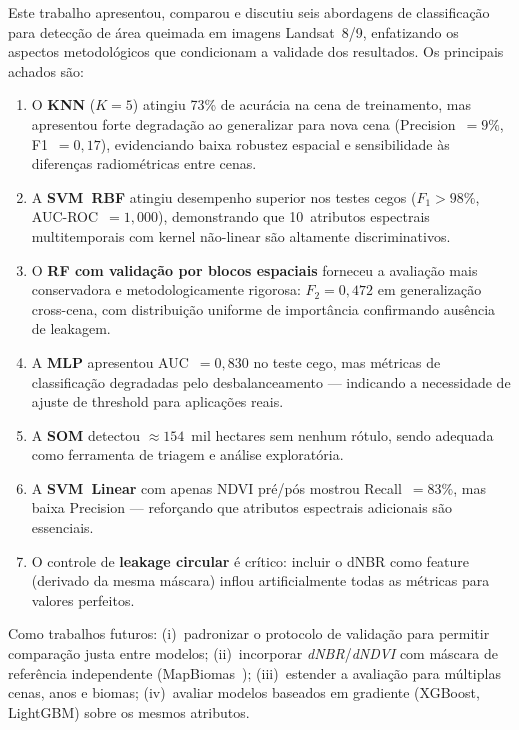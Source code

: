 \documentclass[conference]{IEEEtran}
\begin{document}
Este trabalho apresentou, comparou e discutiu seis abordagens de
classificação para detecção de área queimada em imagens Landsat~8/9,
enfatizando os aspectos metodológicos que condicionam a validade dos
resultados. Os principais achados são:

\begin{enumerate}
  \item O \textbf{KNN} ($K=5$) atingiu 73\% de acurácia na cena de
        treinamento, mas apresentou forte degradação ao generalizar para
        nova cena (Precision~$= 9\%$, F1~$= 0{,}17$), evidenciando baixa
        robustez espacial e sensibilidade às diferenças radiométricas
        entre cenas.
  \item A \textbf{SVM~RBF} atingiu desempenho superior nos testes cegos
        ($F_1 > 98\%$, AUC-ROC~$= 1{,}000$), demonstrando que 10~atributos
        espectrais multitemporais com kernel não-linear são altamente
        discriminativos.
  \item O \textbf{RF com validação por blocos espaciais} forneceu a
        avaliação mais conservadora e metodologicamente rigorosa:
        $F_2 = 0{,}472$ em generalização cross-cena, com distribuição
        uniforme de importância confirmando ausência de leakagem.
  \item A \textbf{MLP} apresentou AUC~$= 0{,}830$ no teste cego, mas
        métricas de classificação degradadas pelo desbalanceamento —
        indicando a necessidade de ajuste de threshold para aplicações reais.
  \item A \textbf{SOM} detectou $\approx154$~mil hectares sem nenhum
        rótulo, sendo adequada como ferramenta de triagem e análise
        exploratória.
  \item A \textbf{SVM~Linear} com apenas NDVI pré/pós mostrou Recall~$= 83\%$,
        mas baixa Precision — reforçando que atributos espectrais adicionais
        são essenciais.
  \item O controle de \textbf{leakage circular} é crítico: incluir o dNBR
        como feature (derivado da mesma máscara) inflou artificialmente todas
        as métricas para valores perfeitos.
\end{enumerate}

Como trabalhos futuros: (i)~padronizar o protocolo de validação para
permitir comparação justa entre modelos; (ii)~incorporar
\textit{dNBR}/\textit{dNDVI} com máscara de referência independente
(MapBiomas~\cite{b6}); (iii)~estender a avaliação para múltiplas cenas,
anos e biomas; (iv)~avaliar modelos baseados em gradiente (XGBoost,
LightGBM) sobre os mesmos atributos.
\end{document}
